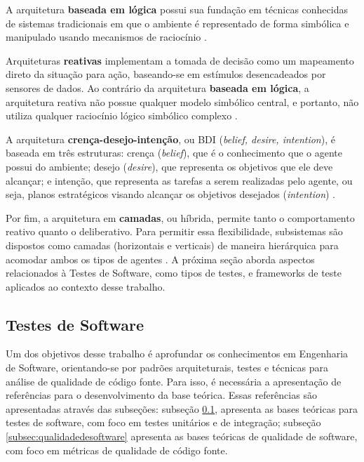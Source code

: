 A arquitetura \textbf{baseada em lógica} possui sua fundação em técnicas
conhecidas de sistemas tradicionais em que o ambiente é representado de forma
simbólica e manipulado usando mecanismos de raciocínio \cite{fabio2007}.

Arquiteturas \textbf{reativas} implementam a tomada de decisão como um
mapeamento direto da situação para ação, baseando-se em estímulos
desencadeados por sensores de dados. Ao contrário da arquitetura
\textbf{baseada em lógica}, a arquitetura reativa não possue qualquer modelo
simbólico central, e portanto, não utiliza qualquer raciocínio lógico
simbólico complexo \cite{fabio2007}.

A arquitetura \textbf{crença-desejo-intenção}, ou BDI (\textit{belief, desire,
intention}), é baseada em três estruturas: crença (\textit{belief}), que é o
conhecimento que o agente possui do ambiente; desejo (\textit{desire}), que
representa os objetivos que ele deve alcançar; e intenção,  que representa as
tarefas a serem realizadas pelo agente, ou seja, planos estratégicos visando
alcançar os objetivos desejados (\textit{intention}) \cite{fabio2007}.

Por fim, a arquitetura em \textbf{camadas}, ou híbrida, permite tanto o
comportamento reativo quanto o deliberativo. Para permitir essa flexibilidade,
subsistemas são dispostos como camadas (horizontais e verticais) de maneira
hierárquica para acomodar ambos os tipos de agentes \cite{fabio2007}. A próxima
seção aborda aspectos relacionados à Testes de Software, como tipos de testes,
e frameworks de teste aplicados ao contexto desse trabalho.

  \subsection{Testes de Software}
  \label{subsec:testedesoftware}

Um dos objetivos desse trabalho é aprofundar os conhecimentos em Engenharia de
Software, orientando-se por padrões arquiteturais, testes e técnicas para
análise de qualidade de código fonte. Para isso, é necessária a apresentação de
referências para o desenvolvimento da base teórica. Essas referências
são apresentadas através das subseções: subseção \ref{subsec:testedesoftware},
apresenta as bases teóricas para testes de software, com foco em testes
unitários e de integração; subseção \ref{subsec:qualidadedesoftware} apresenta
as bases teóricas de qualidade de software, com foco em métricas de qualidade
de código fonte.

